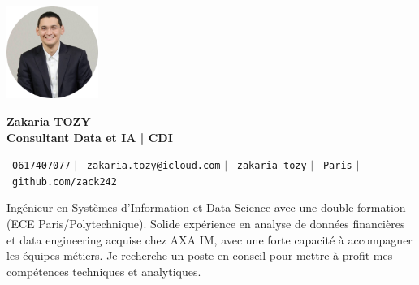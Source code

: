 \documentclass[11pt,a4paper]{article}
\begin{document}
\begin{flushleft}
  \begin{minipage}[c]{0.2\textwidth}
    \includegraphics[width=3cm]{images/profilpicture.png}
  \end{minipage}%
  \begin{minipage}[c]{0.8\textwidth}
    {\Huge \textbf{Zakaria TOZY}} \\[5pt]
    {\Large \textbf{Consultant Data et IA | CDI}}
  \end{minipage}
\end{flushleft}

\vspace{-5pt}

\begin{center}
    \small \faPhone\ \texttt{0617407077} \hspace{1pt} $|$
    \hspace{1pt} \faEnvelope\ \texttt{zakaria.tozy@icloud.com} \hspace{1pt} $|$
    \hspace{1pt} \faLinkedin\ \texttt{zakaria-tozy} \hspace{1pt} $|$
    \hspace{1pt} \faMapMarker\ \texttt{Paris} \hspace{1pt} $|$
    \hspace{1pt} \faGithub\ \texttt{github.com/zack242} \\ \vspace{0pt}
\end{center}

\begin{itemize}[leftmargin=0in, label={}]
\footnotesize{\item{
Ingénieur en Systèmes d'Information et Data Science avec une double formation (ECE Paris/Polytechnique). Solide expérience en analyse de données financières et data engineering acquise chez AXA IM, avec une forte capacité à accompagner les équipes métiers. Je recherche un poste en conseil pour mettre à profit mes compétences techniques et analytiques.
}}
\end{itemize}
\end{document}
